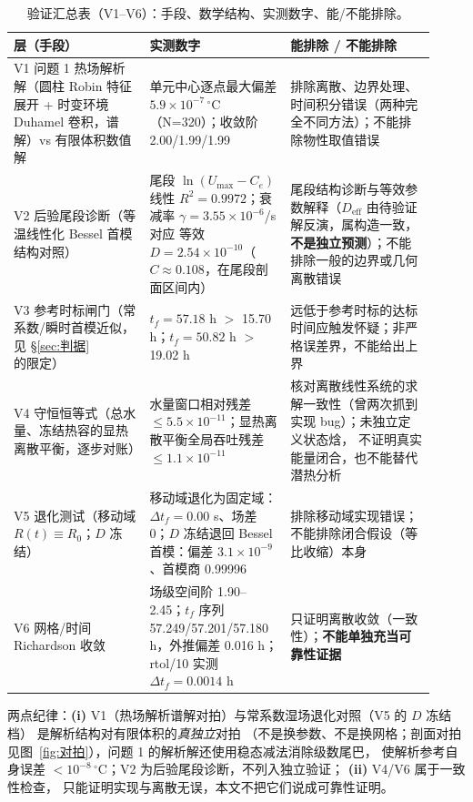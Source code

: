\documentclass[12pt,a4paper]{ctexart}
\numberwithin{equation}{section}
\begin{document}
\begin{table}[htbp]
\centering
\caption{验证汇总表（V1--V6）：手段、数学结构、实测数字、能/不能排除。}
\label{tab:验证}
\small
\begin{tabular}{p{0.30\linewidth}p{0.30\linewidth}p{0.32\linewidth}}
\toprule
层（手段） & 实测数字 & 能排除 / 不能排除 \\
\midrule
V1 问题 1 热场解析解（圆柱 Robin 特征展开 + 时变环境 Duhamel 卷积，谱解）vs 有限体积数值解 &
单元中心逐点最大偏差 $5.9\times10^{-7}\,^{\circ}$C（N=320）；收敛阶 2.00/1.99/1.99 &
排除离散、边界处理、时间积分错误（两种完全不同方法）；不能排除物性取值错误 \\
V2 后验尾段诊断（等温线性化 Bessel 首模结构对照） &
尾段 $\ln(U_{\max}-C_e)$ 线性 $R^2=0.9972$；衰减率 $\gamma=3.55\times10^{-6}$/s 对应
等效 $D=2.54\times10^{-10}$（$C\approx0.108$，在尾段剖面区间内） &
尾段结构诊断与等效参数解释（$D_{\mathrm{eff}}$ 由待验证解反演，属构造一致，
\textbf{不是独立预测}）；不能排除一般的边界或几何离散错误 \\
V3 参考时标闸门（常系数/瞬时首模近似，见 \S\ref{sec:判据}的限定） &
$t_f=57.18$ h $>$ 15.70 h；$t_f=50.82$ h $>$ 19.02 h &
远低于参考时标的达标时间应触发怀疑；非严格误差界，不能给出上界 \\
V4 守恒恒等式（总水量、冻结热容的显热离散平衡，逐步对账） &
水量窗口相对残差 $\le5.5\times10^{-11}$；显热离散平衡全局吞吐残差 $\le1.1\times10^{-11}$ &
核对离散线性系统的求解一致性（曾两次抓到实现 bug）；未独立定义状态焓，
不证明真实能量闭合，也不能替代潜热分析 \\
V5 退化测试（移动域 $R(t)\equiv R_0$；$D$ 冻结） &
移动域退化为固定域：$\Delta t_f=0.00$ s、场差 0；$D$ 冻结退回 Bessel 首模：偏差
$3.1\times10^{-9}$、首模商 0.99996 &
排除移动域实现错误；不能排除闭合假设（等比收缩）本身 \\
V6 网格/时间 Richardson 收敛 &
场级空间阶 1.90--2.45；$t_f$ 序列 57.249/57.201/57.180 h，外推偏差 0.016 h；
rtol/10 实测 $\Delta t_f=0.0014$ h &
只证明离散收敛（一致性）；\textbf{不能单独充当可靠性证据} \\
\bottomrule
\end{tabular}
\end{table}

两点纪律：\textbf{(i)} V1（热场解析谱解对拍）与常系数湿场退化对照（V5 的 $D$ 冻结档）
是解析结构对有限体积的\emph{真独立}对拍
（不是换参数、不是换网格；剖面对拍见图~\ref{fig:对拍}），问题 1 的解析解还使用稳态减法消除级数尾巴，
使解析参考自身误差 $<10^{-8}\,^{\circ}$C；V2 为后验尾段诊断，不列入独立验证；
\textbf{(ii)} V4/V6 属于一致性检查，
只能证明实现与离散无误，本文不把它们说成可靠性证明。
\end{document}
